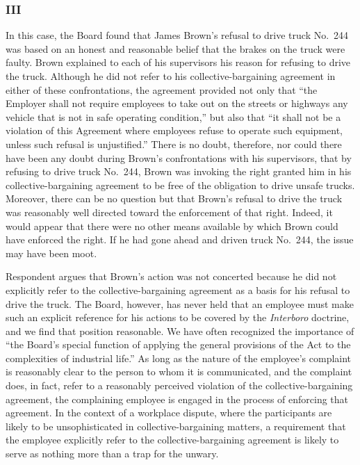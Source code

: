 \documentclass[
  letterpaper,
  11pt,
  DIV=9,
  openright]{scrbook}
\begin{document}
\subsubsection{III}\label{iii}

In this case, the Board found that James Brown's refusal to drive truck
No.~244 was based on an honest and reasonable belief that the brakes on
the truck were faulty. Brown explained to each of his supervisors his
reason for refusing to drive the truck. Although he did not refer to his
collective-bargaining agreement in either of these confrontations, the
agreement provided not only that ``the Employer shall not require
employees to take out on the streets or highways any vehicle that is not
in safe operating condition,'' but also that ``it shall not be a
violation of this Agreement where employees refuse to operate such
equipment, unless such refusal is unjustified.'' There is no doubt,
therefore, nor could there have been any doubt during Brown's
confrontations with his supervisors, that by refusing to drive truck
No.~244, Brown was invoking the right granted him in his
collective-bargaining agreement to be free of the obligation to drive
unsafe trucks. Moreover, there can be no question but that Brown's
refusal to drive the truck was reasonably well directed toward the
enforcement of that right. Indeed, it would appear that there were no
other means available by which Brown could have enforced the right. If
he had gone ahead and driven truck No.~244, the issue may have been
moot.

Respondent argues that Brown's action was not concerted because he did
not explicitly refer to the collective-bargaining agreement as a basis
for his refusal to drive the truck. The Board, however, has never held
that an employee must make such an explicit reference for his actions to
be covered by the \emph{Interboro} doctrine, and we find that position
reasonable. We have often recognized the importance of ``the Board's
special function of applying the general provisions of the Act to the
complexities of industrial life.'' As long as the nature of the
employee's complaint is reasonably clear to the person to whom it is
communicated, and the complaint does, in fact, refer to a reasonably
perceived violation of the collective-bargaining agreement, the
complaining employee is engaged in the process of enforcing that
agreement. In the context of a workplace dispute, where the participants
are likely to be unsophisticated in collective-bargaining matters, a
requirement that the employee explicitly refer to the
collective-bargaining agreement is likely to serve as nothing more than
a trap for the unwary.
\end{document}
